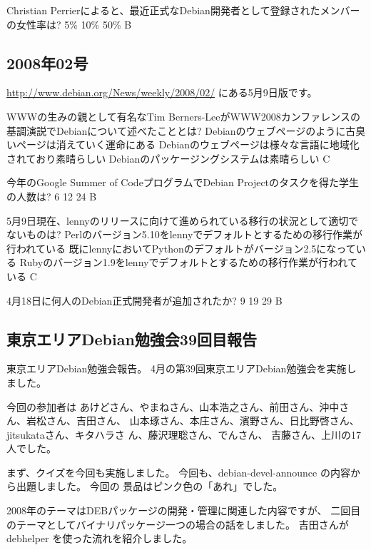 \documentclass[mingoth,a4paper]{jsarticle}
\begin{document}
\begin{multicols}{2}
 \santaku
 {Christian Perrierによると、最近正式なDebian開発者として登録されたメンバーの女性率は?}
 {5\%{}}
 {10\%{}}
 {50\%{}}
 {B}
 
 \subsection{2008年02号}
 \url{http://www.debian.org/News/weekly/2008/02/}
 にある5月9日版です。
 
 \santaku
 {WWWの生みの親として有名なTim Berners-LeeがWWW2008カンファレンスの基調演説でDebianについて述べたこととは?}
 {Debianのウェブページのように古臭いページは消えていく運命にある}
 {Debianのウェブページは様々な言語に地域化されており素晴らしい}
 {Debianのパッケージングシステムは素晴らしい}
 {C}
 
 \santaku
 {今年のGoogle Summer of CodeプログラムでDebian Projectのタスクを得た学生の人数は?}
 {6}
 {12}
 {24}
 {B}
 
 \santaku
 {5月9日現在、lennyのリリースに向けて進められている移行の状況として適切でないものは?}
 {Perlのバージョン5.10をlennyでデフォルトとするための移行作業が行われている}
 {既にlennyにおいてPythonのデフォルトがバージョン2.5になっている}
 {Rubyのバージョン1.9をlennyでデフォルトとするための移行作業が行われている}
 {C}
 
 \santaku
 {4月18日に何人のDebian正式開発者が追加されたか?}
 {9}
 {19}
 {29}
 {B}
 
\end{multicols}

\subsection{東京エリアDebian勉強会39回目報告}


東京エリアDebian勉強会報告。
4月の第39回東京エリアDebian勉強会を実施しました。

今回の参加者は
あけどさん、やまねさん、山本浩之さん、前田さん、沖中さん、岩松さん、吉田さん、
山本琢さん、本庄さん、濱野さん、日比野啓さん、jitsukataさん、キタハラさ
ん、藤沢理聡さん、でんさん、
吉藤さん、上川の17人でした。

まず、クイズを今回も実施しました。
今回も、debian-devel-announce の内容から出題しました。
今回の
景品はピンク色の「あれ」でした。

2008年のテーマはDEBパッケージの開発・管理に関連した内容ですが、
二回目のテーマとしてバイナリパッケージ一つの場合の話をしました。
吉田さんがdebhelper を使った流れを紹介しました。
\end{document}
